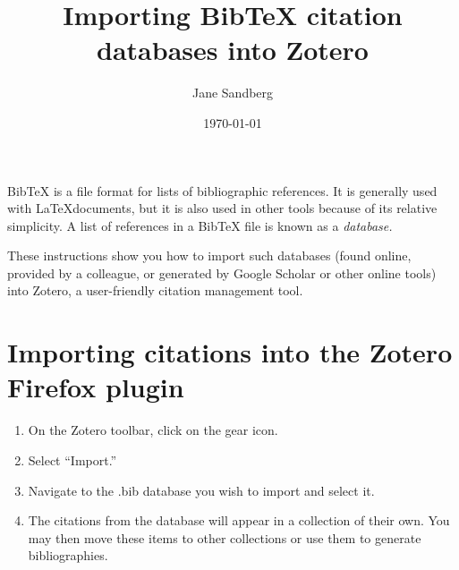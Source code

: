 \documentclass[11pt,a4paper]{article}
\title{Importing BibTeX citation databases into Zotero}
\author{Jane Sandberg}
\date{\today}
\begin{document}
\maketitle

BibTeX is a file format for lists of bibliographic references.  It is generally used with \LaTeX documents, but it is also used in other tools because of its relative simplicity.  A list of references in a BibTeX file is known as a \emph{database.}

These instructions show you how to import such databases (found online, provided by a colleague, or generated by Google Scholar or other online tools) into Zotero, a user-friendly citation management tool.

\section*{Importing citations into the Zotero Firefox plugin}
\begin{enumerate}
\item On the Zotero toolbar, click on the gear icon.
\item Select ``Import.''
\item Navigate to the .bib database you wish to import and select it.
\item The citations from the database will appear in a collection of their own.  You may then move these items to other collections or use them to generate bibliographies.
\end{enumerate}
\end{document}
